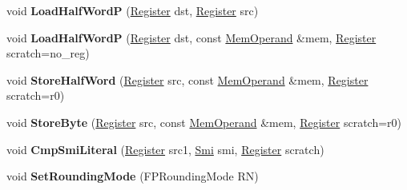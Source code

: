 \begin{DoxyCompactItemize}
\item 
\mbox{\label{classv8_1_1internal_1_1TurboAssembler_ac71c835d97555dbfc6933ce83f3cf55c}} 
void {\bfseries Load\+Half\+WordP} (\mbox{\hyperlink{classv8_1_1internal_1_1Register}{Register}} dst, \mbox{\hyperlink{classv8_1_1internal_1_1Register}{Register}} src)
\item 
\mbox{\label{classv8_1_1internal_1_1TurboAssembler_a3cc0c674eade0cb4650bc9dd26422d39}} 
void {\bfseries Load\+Half\+WordP} (\mbox{\hyperlink{classv8_1_1internal_1_1Register}{Register}} dst, const \mbox{\hyperlink{classv8_1_1internal_1_1MemOperand}{Mem\+Operand}} \&mem, \mbox{\hyperlink{classv8_1_1internal_1_1Register}{Register}} scratch=no\+\_\+reg)
\item 
\mbox{\label{classv8_1_1internal_1_1TurboAssembler_aafda27192d0e7b97633985078e9bb201}} 
void {\bfseries Store\+Half\+Word} (\mbox{\hyperlink{classv8_1_1internal_1_1Register}{Register}} src, const \mbox{\hyperlink{classv8_1_1internal_1_1MemOperand}{Mem\+Operand}} \&mem, \mbox{\hyperlink{classv8_1_1internal_1_1Register}{Register}} scratch=r0)
\item 
\mbox{\label{classv8_1_1internal_1_1TurboAssembler_a9e448291494bce06422b297cc3493f38}} 
void {\bfseries Store\+Byte} (\mbox{\hyperlink{classv8_1_1internal_1_1Register}{Register}} src, const \mbox{\hyperlink{classv8_1_1internal_1_1MemOperand}{Mem\+Operand}} \&mem, \mbox{\hyperlink{classv8_1_1internal_1_1Register}{Register}} scratch=r0)
\item 
\mbox{\label{classv8_1_1internal_1_1TurboAssembler_ab2c91b2ec9532ffa0786dc70cc9b5aa8}} 
void {\bfseries Cmp\+Smi\+Literal} (\mbox{\hyperlink{classv8_1_1internal_1_1Register}{Register}} src1, \mbox{\hyperlink{classv8_1_1internal_1_1Smi}{Smi}} smi, \mbox{\hyperlink{classv8_1_1internal_1_1Register}{Register}} scratch)
\item 
\mbox{\label{classv8_1_1internal_1_1TurboAssembler_abf5be88b3e4b4ebe838da239662de5fd}} 
void {\bfseries Set\+Rounding\+Mode} (F\+P\+Rounding\+Mode RN)
\item 
\mbox{\label{classv8_1_1internal_1_1TurboAssembler_a173b55d139ff2c9ff4841e3738255cb3}} 

\end{DoxyCompactItemize}
